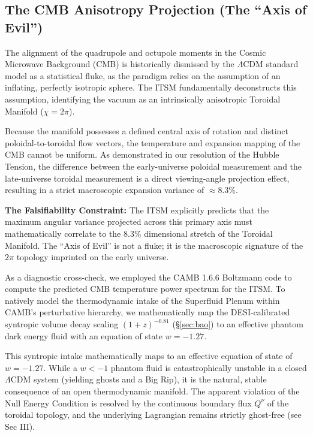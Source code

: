 \documentclass[aps,prd,10pt,twocolumn,superscriptaddress,nofootinbib]{revtex4-2}
\begin{document}
\subsection{The CMB Anisotropy Projection (The ``Axis of Evil'')}
The alignment of the quadrupole and octupole moments in the Cosmic Microwave Background (CMB) \cite{axis_of_evil} is historically dismissed by the $\Lambda$CDM standard model as a statistical fluke, as the paradigm relies on the assumption of an inflating, perfectly isotropic sphere. The ITSM fundamentally deconstructs this assumption, identifying the vacuum as an intrinsically anisotropic Toroidal Manifold ($\chi=2\pi$).

Because the manifold possesses a defined central axis of rotation and distinct poloidal-to-toroidal flow vectors, the temperature and expansion mapping of the CMB cannot be uniform. As demonstrated in our resolution of the Hubble Tension, the difference between the early-universe poloidal measurement and the late-universe toroidal measurement is a direct viewing-angle projection effect, resulting in a strict macroscopic expansion variance of $\approx 8.3\%$.

\textbf{The Falsifiability Constraint:} The ITSM explicitly predicts that the maximum angular variance projected across this primary axis must mathematically correlate to the 8.3\% dimensional stretch of the Toroidal Manifold. The ``Axis of Evil'' is not a fluke; it is the macroscopic signature of the $2\pi$ topology imprinted on the early universe.

As a diagnostic cross-check, we employed the CAMB 1.6.6 Boltzmann code \cite{camb} to compute the predicted CMB temperature power spectrum for the ITSM. To natively model the thermodynamic intake of the Superfluid Plenum within CAMB's perturbative hierarchy, we mathematically map the DESI-calibrated syntropic volume decay scaling $(1+z)^{-0.81}$ (\S\ref{sec:bao}) to an effective phantom dark energy fluid with an equation of state $w = -1.27$.

This syntropic intake mathematically maps to an effective equation of state of $w = -1.27$. While a $w < -1$ phantom fluid is catastrophically unstable in a closed $\Lambda$CDM system (yielding ghosts and a Big Rip), it is the natural, stable consequence of an open thermodynamic manifold. The apparent violation of the Null Energy Condition is resolved by the continuous boundary flux $Q^\nu$ of the toroidal topology, and the underlying Lagrangian remains strictly ghost-free (see Sec III).
\end{document}

